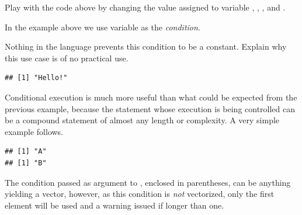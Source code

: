 \documentclass[krantz2]{krantz}\usepackage{knitr}%
\begin{document}
\begin{playground}
Play with the code above by changing the value assigned to variable , , , and .

In the example above we use variable  as the \emph{condition}.

Nothing in the \Rlang language prevents this condition to be a  constant. Explain why this use case is of no practical use.

\begin{knitrout}\footnotesize
{}\color{fgcolor}\begin{kframe}
\begin{alltt}
 \hlstd{(}\hlstd{)} \hlstd{(}\hlstd{)}
\end{alltt}
\begin{verbatim}
## [1] "Hello!"
\end{verbatim}
\end{kframe}
\end{knitrout}
\end{playground}

Conditional execution is much more useful than what could be expected from the previous example, because the statement whose execution is being controlled can be a compound statement of almost any length or complexity. A very simple example follows.

\begin{knitrout}\footnotesize
{}\color{fgcolor}\begin{kframe}
\begin{alltt}
 \hlkwb{<-} 
 
  \hlstd{(}\hlstd{)}
  \hlstd{(}\hlstd{)}
\hlstd{\}}
\end{alltt}
\begin{verbatim}
## [1] "A"
## [1] "B"
\end{verbatim}
\end{kframe}
\end{knitrout}

The condition passed as argument to , enclosed in parentheses, can be anything yielding a  vector, however, as this condition is \emph{not} vectorized, only the first element will be used and a warning issued if longer than one.
\end{document}
